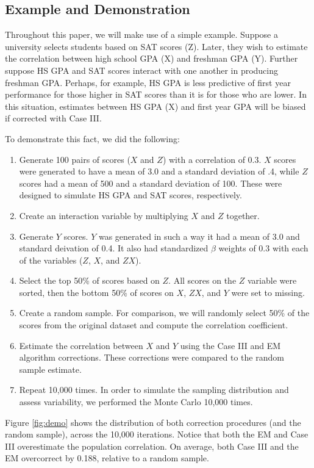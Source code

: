 \documentclass[man, babel,english]{apa}%
\begin{document}
\subsection{Example and Demonstration}

Throughout this paper, we will make use of a simple example. Suppose a university selects students based on SAT scores (Z). Later, they wish to estimate the correlation between high school GPA (X) and freshman GPA (Y). Further suppose HS GPA and SAT scores interact with one another in producing freshman GPA. Perhaps, for example, HS GPA is less predictive of first year performance for those higher in SAT scores than it is for those who are lower. In this situation, estimates between HS GPA (X) and first year GPA will be biased if corrected with Case III.

To demonstrate this fact, we did the following:

\begin{enumerate}
\item Generate 100 pairs of scores ($X$ and $Z$) with a correlation of 0.3. $X$ scores were generated to have a mean of 3.0 and a standard deviation of .4, while $Z$ scores had a mean of 500 and a standard deviation of 100. These were designed to simulate HS GPA and SAT scores, respectively. 
\item Create an interaction variable by multiplying $X$ and $Z$ together.
\item Generate $Y$ scores. $Y$ was generated in such a way it had a mean of 3.0 and standard deivation of 0.4. It also had standardized $\beta$ weights of 0.3 with each of the variables ($Z$, $X$, and $ZX$).  
\item Select the top 50\% of scores based on $Z$. All scores on the $Z$ variable were sorted, then the bottom 50\% of scores on $X$, $ZX$, and $Y$ were set to missing.
\item Create a random sample. For comparison, we will randomly select 50\% of the scores from the original dataset and compute the correlation coefficient. 
\item Estimate the correlation between $X$ and $Y$ using the Case III and EM algorithm corrections. These corrections were compared to the random sample estimate.
\item Repeat 10,000 times. In order to simulate the sampling distribution and assess variability, we performed the Monte Carlo 10,000 times. 
\end{enumerate}

Figure \ref{fig:demo} shows the distribution of both correction procedures (and the random sample), across the 10,000 iterations. Notice that both the EM and Case III overestimate the population correlation. On average, both Case III and the EM overcorrect by 0.188, relative to a random sample. 
\end{document}

